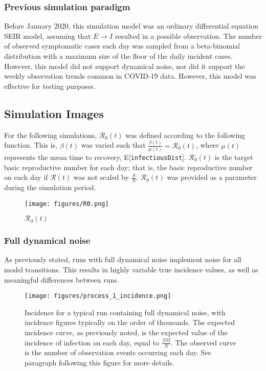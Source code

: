 \documentclass{article}
\newcommand{\nR}{\mathcal{R}}
\newcommand{\code}[1]{\texttt{#1}}
\begin{document}
\subsubsection{Previous simulation paradigm}
Before January 2020, this simulation model was an ordinary differential equation SEIR model, assuming that $E \rightarrow I$  resulted in a possible observation. The number of observed symptomatic cases each day was sampled from a beta-binomial distribution with a maximum size of the floor of the daily incident cases. However, this model did not support dynamical noise, nor did it support the weekly observation trends common in COVID-19 data. However, this model was effective for testing purposes.

\clearpage
\subsection{Simulation Images}

For the following simulations, $\nR_0(t)$ was defined according to the following function. This is, $\beta(t)$ was varied such that $\frac{\beta(t)}{\mu(t)} = \nR_0(t)$, where $\mu(t)$ represents the mean time to recovery, E[\code{infectiousDist}]. $\nR_0(t)$ is the target basic reproductive number for each day; that is, the basic reproductive number on each day if $\nR(t)$ was not scaled by $\frac{S}{N}$. $\nR_0(t)$ was provided as a parameter during the simulation period. 

\begin{figure}[h!]
    \centering
    \texttt{[image: figures/R0.png]}
    \caption{$\nR_0(t)$}
    \label{fig:my_label}
\end{figure}

\subsubsection{Full dynamical noise}
As previously stated, runs with full dynamical noise implement noise for all model transitions. This results in highly variable true incidence values, as well as meaningful differences between runs.

\begin{figure}[h!]
    \centering
    \texttt{[image: figures/process\_1\_incidence.png]}
    \caption{Incidence for a typical run containing full dynamical noise, with incidence figures typically on the order of thousands. The expected incidence curve, as previously noted, is the expected value of the incidence of infection on each day, equal to $\frac{\beta SI}{N}$. The observed curve is the number of observation events occurring each day. See paragraph following this figure for more details.} 
   	\label{ProcessIncidence}
\end{figure}
\end{document}
